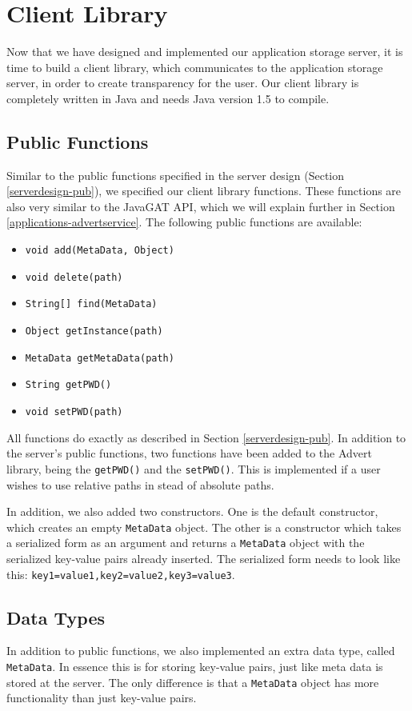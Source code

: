 \section{Client Library}
\label{clientimpl}
Now that we have designed and implemented our application storage server, it is
time to build a client library, which communicates to the application storage
server, in order to create transparency for the user. Our client library is
completely written in Java and needs Java version 1.5 to compile.

\subsection{Public Functions}
Similar to the public functions specified in the server design (Section
\ref{serverdesign-pub}), we specified our client library functions. These
functions are also very similar to the JavaGAT API, which we will explain
further in Section \ref{applications-advertservice}. The following public
functions are available:

\begin{itemize}
	\item \texttt{void add(MetaData, Object)} 
	\item \texttt{void delete(path)}
	\item \texttt{String[] find(MetaData)}
	\item \texttt{Object getInstance(path)}
	\item \texttt{MetaData getMetaData(path)}
	\item \texttt{String getPWD()}
	\item \texttt{void setPWD(path)} 
\end{itemize}

All functions do exactly as described in Section \ref{serverdesign-pub}. In
addition to the server's public functions, two functions have been added to the
Advert library, being the \texttt{getPWD()} and the \texttt{setPWD()}. This is
implemented if a user wishes to use relative paths in stead of absolute paths.

In addition, we also added two constructors. One is the default constructor,
which creates an empty \texttt{MetaData} object. The other is a constructor
which takes a serialized form as an argument and returns a \texttt{MetaData}
object with the serialized key-value pairs already inserted. The serialized
form needs to look like this: \texttt{key1=value1,key2=value2,key3=value3}.

\subsection{Data Types}
In addition to public functions, we also implemented an extra data type, called
\texttt{MetaData}. In essence this is for storing key-value pairs, just like
meta data is stored at the server. The only difference is that a
\texttt{MetaData} object has more functionality than just key-value pairs.

